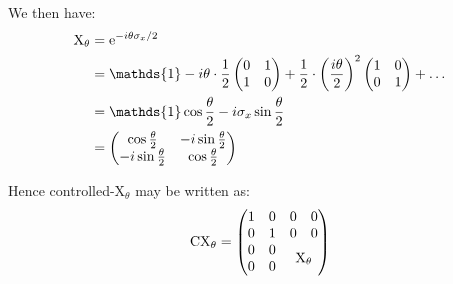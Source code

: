 \begin{parts}
	We then have:
	\begin{align*}
		\mathrm{X}_\theta &= \mathrm{e}^{-i\theta\sigma_x / 2} \\
		&= \mathds{1} - i\theta \cdot \frac{1}{2}
		\begin{pmatrix}
			0 & 1 \\
			1 & 0
		\end{pmatrix}
		+ \frac{1}{2} \cdot \rbracket{\frac{i\theta}{2}}^2
		\begin{pmatrix}
			1 & 0 \\
			0 & 1
		\end{pmatrix}
		+ \ldots \\
		&= \mathds{1} \cos\frac{\theta}{2} - i\sigma_x \sin\frac{\theta}{2} \\
		&= \begin{pmatrix}
			\cos\frac{\theta}{2} & -i\sin\frac{\theta}{2} \\
			-i\sin\frac{\theta}{2} & \cos\frac{\theta}{2}
		\end{pmatrix}
	\end{align*}
	
	Hence controlled-$\mathrm{X}_\theta$ may be written as:
	\begin{equation*}
		\mathrm{CX}_\theta = \begin{pmatrix}
			1 & 0 & 0 & 0 \\
			0 & 1 & 0 & 0 \\
			0 & 0 & \multicolumn{2}{c}{\multirow{2}{*}{$\mathrm{X}_\theta$}} \\
			0 & 0 & \multicolumn{2}{c}{}
		\end{pmatrix}
	\end{equation*}
	

\end{parts}
